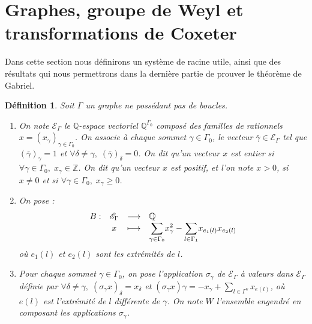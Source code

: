 \documentclass[a4paper,11pt]{article}
\newtheorem{defi}[thm]{Définition}%
\newcommand{\dps}{\displaystyle}
\begin{document}
\section{Graphes, groupe de Weyl et transformations de Coxeter}
	Dans cette section nous définirons un système de racine utile, ainsi que des résultats qui nous permettrons dans la dernière partie de prouver le théorème de Gabriel.
		\begin{defi}
		Soit $\Gamma$ un graphe ne possédant pas de boucles.
		\begin{enumerate}
			\item On note $\mathscr E_{\Gamma}$ le $\mathbb Q$-espace vectoriel $\mathbb Q^{\Gamma_0}$ composé des familles de rationnels $x=(x_\gamma)_{\gamma\in\Gamma_0}$. On associe à chaque sommet $\gamma\in\Gamma_0$, le vecteur $\bar{\gamma}\in\mathscr E_\Gamma$ tel que $(\bar\gamma)_\gamma=1$ et $\forall \delta\neq\gamma,\;(\bar\gamma)_\delta=0$. On dit qu'un vecteur $x$ est \emph{entier} si $\forall\gamma\in\Gamma_{0},\;x_\gamma\in\mathbb Z$. On dit qu'un vecteur $x$ est \emph{positif}, et l'on note $x>0$, si $x\neq0$ et si $\forall\gamma\in\Gamma_0,\;x_\gamma\geq0$.
			\item On pose :
				\[
					\begin{array}{rcc>{\dps}l}
					B:&\mathscr E_{\Gamma}&\longrightarrow&\mathbb Q\\
					&x&\longmapsto&\underset{\gamma\in\Gamma_0}{\sum} x_\gamma^2-\underset{l\in\Gamma_1}{\sum}x_{e_1(l)}x_{e_2(l)}\\
				\end{array}
			\]
			où $e_1(l)$ et $e_2(l)$ sont les extrémités de $l$.
		\item Pour chaque sommet $\gamma\in\Gamma_0$, on pose l'application $\sigma_\gamma$ de $\mathscr E_\Gamma$ à valeurs dans $\mathscr E_\Gamma$ définie par $\forall\delta\neq\gamma,\; (\sigma_\gamma x)_\delta=x_\delta$ et $(\sigma_\gamma x)\gamma=-x_\gamma+\sum_{l\in\Gamma^\gamma}x_{e(l)}$, où $e(l)$ est l'extrémité de $l$ différente de $\gamma$. On note $W$ l'ensemble engendré en composant les applications $\sigma_\gamma$.
		\end{enumerate}
		\end{defi}
\end{document}
